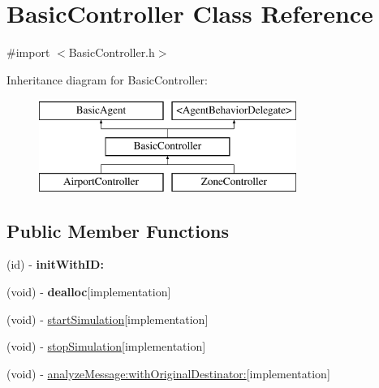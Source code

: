 \hypertarget{interface_basic_controller}{
\section{\-Basic\-Controller \-Class \-Reference}
\label{interface_basic_controller}
}


{\ttfamily \#import $<$\-Basic\-Controller.\-h$>$}

\-Inheritance diagram for \-Basic\-Controller\-:\begin{figure}[H]
\begin{center}
\leavevmode
\includegraphics[height=3.000000cm]{interface_basic_controller}
\end{center}
\end{figure}
\subsection*{\-Public \-Member \-Functions}
\begin{DoxyCompactItemize}
\item 
\hypertarget{interface_basic_controller_a566d7c40b54e999e418e177828975e4f}{
(id) -\/ {\bfseries init\-With\-I\-D\-:}}
\label{interface_basic_controller_a566d7c40b54e999e418e177828975e4f}

\item 
\hypertarget{interface_basic_controller_a0f6206fcb9b1a1fbad2575b335c237b5}{
(void) -\/ {\bfseries dealloc}{\ttfamily  \mbox{[}implementation\mbox{]}}}
\label{interface_basic_controller_a0f6206fcb9b1a1fbad2575b335c237b5}

\item 
(void) -\/ \hyperlink{interface_basic_controller_a6fb09a381fa1044c1a133d3aeb0b02e6}{start\-Simulation}{\ttfamily  \mbox{[}implementation\mbox{]}}
\item 
(void) -\/ \hyperlink{interface_basic_controller_a2a7181ab5a5de771efb559fd110b63b0}{stop\-Simulation}{\ttfamily  \mbox{[}implementation\mbox{]}}
\item 
(void) -\/ \hyperlink{interface_basic_controller_aa08efe5b2a6835efe6cdbd60084c7888}{analyze\-Message\-:with\-Original\-Destinator\-:}{\ttfamily  \mbox{[}implementation\mbox{]}}
\end{DoxyCompactItemize}
